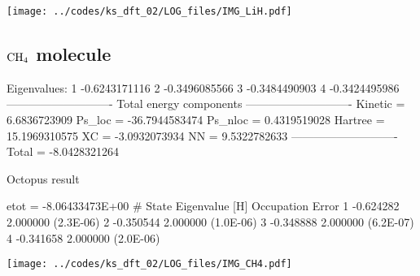 {\centering
\texttt{[image: ../codes/ks\_dft\_02/LOG\_files/IMG\_LiH.pdf]}
}



\subsection{$\ce{CH4}$ molecule}

\begin{textcode}
Eigenvalues:
  1      -0.6243171116
  2      -0.3496085566
  3      -0.3484490903
  4      -0.3424495986
----------------------------
Total energy components
----------------------------
Kinetic =       6.6836723909
Ps_loc  =     -36.7944583474
Ps_nloc =       0.4319519028
Hartree =      15.1969310575
XC      =      -3.0932073934
NN      =       9.5322782633
----------------------------
Total   =      -8.0428321264 
\end{textcode}


Octopus result
\begin{textcode}
 etot  = -8.06433473E+00
#  State  Eigenvalue [H]  Occupation    Error
      1       -0.624282    2.000000   (2.3E-06)
      2       -0.350544    2.000000   (1.0E-06)
      3       -0.348888    2.000000   (6.2E-07)
      4       -0.341658    2.000000   (2.0E-06)   
\end{textcode}

{\centering
\texttt{[image: ../codes/ks\_dft\_02/LOG\_files/IMG\_CH4.pdf]}
}
